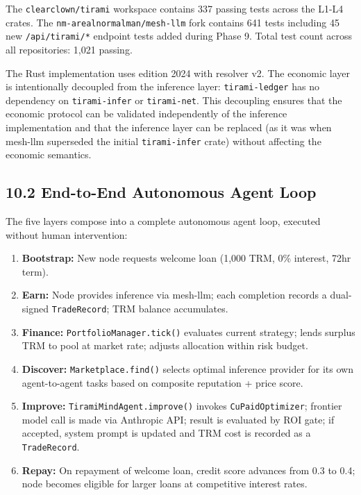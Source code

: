 \documentclass[
  11pt,
]{article}
\providecommand{\tightlist}{%
  \setlength{\itemsep}{0pt}\setlength{\parskip}{0pt}}
\begin{document}
The \texttt{clearclown/tirami} workspace contains 337 passing tests
across the L1-L4 crates. The \texttt{nm-arealnormalman/mesh-llm} fork
contains 641 tests including 45 new \texttt{/api/tirami/*} endpoint
tests added during Phase 9. Total test count across all repositories:
1,021 passing.

The Rust implementation uses edition 2024 with resolver v2. The economic
layer is intentionally decoupled from the inference layer:
\texttt{tirami-ledger} has no dependency on \texttt{tirami-infer} or
\texttt{tirami-net}. This decoupling ensures that the economic protocol
can be validated independently of the inference implementation and that
the inference layer can be replaced (as it was when mesh-llm superseded
the initial \texttt{tirami-infer} crate) without affecting the economic
semantics.

\subsection{10.2 End-to-End Autonomous Agent
Loop}\label{end-to-end-autonomous-agent-loop}

The five layers compose into a complete autonomous agent loop, executed
without human intervention:

\begin{enumerate}
\def\labelenumi{\arabic{enumi}.}
\tightlist
\item
  \textbf{Bootstrap:} New node requests welcome loan (1,000 TRM, 0\%
  interest, 72hr term).
\item
  \textbf{Earn:} Node provides inference via mesh-llm; each completion
  records a dual-signed \texttt{TradeRecord}; TRM balance accumulates.
\item
  \textbf{Finance:} \texttt{PortfolioManager.tick()} evaluates current
  strategy; lends surplus TRM to pool at market rate; adjusts allocation
  within risk budget.
\item
  \textbf{Discover:} \texttt{Marketplace.find()} selects optimal
  inference provider for its own agent-to-agent tasks based on composite
  reputation + price score.
\item
  \textbf{Improve:} \texttt{TiramiMindAgent.improve()} invokes
  \texttt{CuPaidOptimizer}; frontier model call is made via Anthropic
  API; result is evaluated by ROI gate; if accepted, system prompt is
  updated and TRM cost is recorded as a \texttt{TradeRecord}.
\item
  \textbf{Repay:} On repayment of welcome loan, credit score advances
  from 0.3 to 0.4; node becomes eligible for larger loans at competitive
  interest rates.
\end{enumerate}
\end{document}

